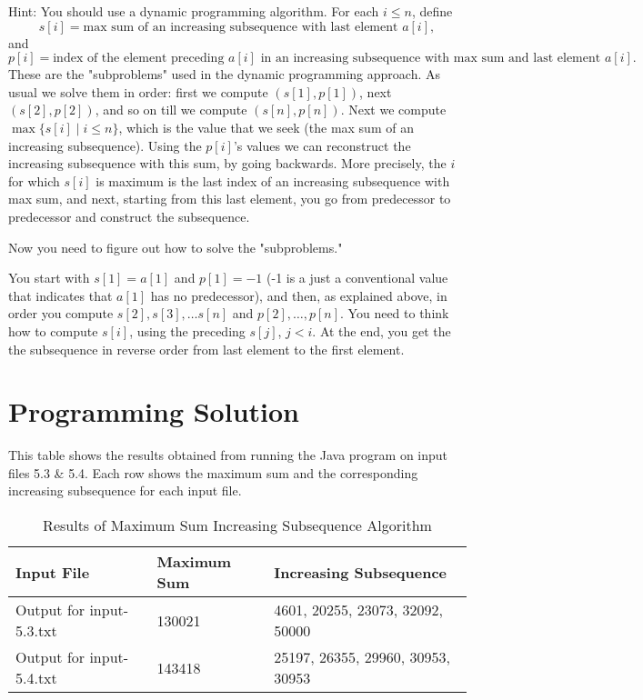 \documentclass[11pt]{article}
\begin{document}
Hint: You should use a dynamic programming algorithm. For each $i \le n$, define
\[
s[i] = \text{max sum of an increasing subsequence with last element } a[i],
\]
and
\[
p[i] = \text{index of the element preceding } a[i] \text{ in an increasing subsequence with max sum and last element } a[i].
\]
These are the "subproblems" used in the dynamic programming approach. As usual we solve them in order: first we compute $(s[1], p[1])$, next $(s[2], p[2])$, and so on till we compute $(s[n], p[n])$. Next we compute $\max\{s[i] \mid i \le n\}$, which is the value that we seek (the max sum of an increasing subsequence). Using the $p[i]$'s values we can reconstruct the increasing subsequence with this sum, by going backwards. More precisely, the $i$ for which $s[i]$ is maximum is the last index of an increasing subsequence with max sum, and next, starting from this last element, you go from predecessor to predecessor and construct the subsequence.

Now you need to figure out how to solve the "subproblems."

You start with $s[1] = a[1]$ and $p[1] = -1$ (-1 is a just a conventional value that indicates that $a[1]$ has no predecessor), and then, as explained above, in order you compute $s[2], s[3], \ldots s[n]$ and $p[2], \ldots, p[n]$. You need to think how to compute $s[i]$, using the preceding $s[j]$, $j < i$. At the end, you get the the subsequence in reverse order from last element to the first element.
\newpage
\section*{Programming Solution}
This table shows the results obtained from running the Java program on input files 5.3 & 5.4. Each row shows the maximum sum and the corresponding increasing subsequence for each input file.

\begin{table}[h]
    \centering
    \begin{tabular}{llp{6cm}}
        \toprule
        \textbf{Input File} & \textbf{Maximum Sum} & \textbf{Increasing Subsequence} \\
        \midrule
        Output for input-5.3.txt & 130021 & 4601, 20255, 23073, 32092, 50000 \\
        Output for input-5.4.txt & 143418 & 25197, 26355, 29960, 30953, 30953 \\
        \bottomrule
    \end{tabular}
    \caption{Results of Maximum Sum Increasing Subsequence Algorithm}
    \label{tab:results}
\end{table}
\newpage
\end{document}
